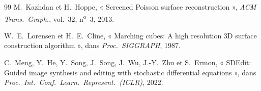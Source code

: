\documentclass[conference]{IEEEtran}
\begin{document}
\begin{thebibliography}{99}
M.~Kazhdan et H.~Hoppe, « Screened Poisson surface reconstruction », \emph{ACM Trans.\
Graph.}, vol.~32, n\textsuperscript{o}~3, 2013.

W.~E.~Lorensen et H.~E.~Cline, « Marching cubes: A high resolution 3D surface
construction algorithm », dans \emph{Proc.\ SIGGRAPH}, 1987.

C.~Meng, Y.~He, Y.~Song, J.~Song, J.~Wu, J.-Y.~Zhu et S.~Ermon, « SDEdit: Guided image
synthesis and editing with stochastic differential equations », dans \emph{Proc.\ Int.\
Conf.\ Learn.\ Represent.\ (ICLR)}, 2022.

\end{thebibliography}
\end{document}
